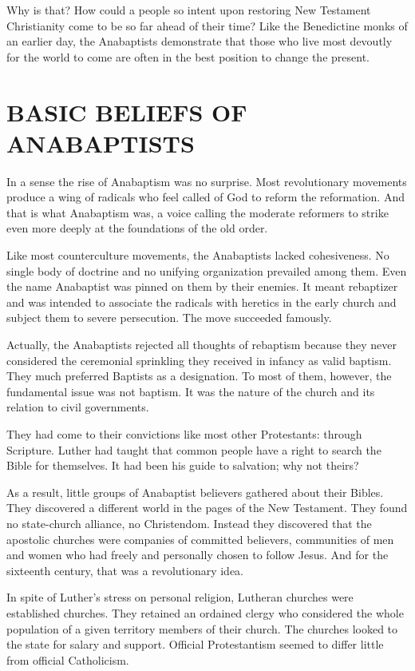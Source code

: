 Why is that? How could a people so intent upon restoring New Testament Christianity come to be so
far ahead of their time? Like the Benedictine monks of an earlier day, the Anabaptists demonstrate
that those who live most devoutly for the world to come are often in the best position to change the
present.

\section{BASIC BELIEFS OF ANABAPTISTS}

In a sense the rise of Anabaptism was no surprise. Most revolutionary movements produce a wing of
radicals who feel called of God to reform the reformation. And that is what Anabaptism was, a voice
calling the moderate reformers to strike even more deeply at the foundations of the old order.

Like most counterculture movements, the Anabaptists lacked cohesiveness. No single body of doctrine
and no unifying organization prevailed among them. Even the name Anabaptist was pinned on them by
their enemies. It meant rebaptizer and was intended to associate the radicals with heretics in the
early church and subject them to severe persecution. The move succeeded famously.

Actually, the Anabaptists rejected all thoughts of rebaptism because they never considered the
ceremonial sprinkling they received in infancy as valid baptism. They much preferred Baptists as a
designation. To most of them, however, the fundamental issue was not baptism. It was the nature of
the church and its relation to civil governments.

They had come to their convictions like most other Protestants: through Scripture. Luther had taught
that common people have a right to search the Bible for themselves. It had been his guide to
salvation; why not theirs?

As a result, little groups of Anabaptist believers gathered about their Bibles. They discovered a
different world in the pages of the New Testament. They found no state-church alliance, no
Christendom. Instead they discovered that the apostolic churches were companies of committed
believers, communities of men and women who had freely and personally chosen to follow Jesus. And
for the sixteenth century, that was a revolutionary idea.

In spite of Luther’s stress on personal religion, Lutheran churches were established churches. They
retained an ordained clergy who considered the whole population of a given territory members of
their church. The churches looked to the state for salary and support. Official Protestantism seemed
to differ little from official Catholicism.

